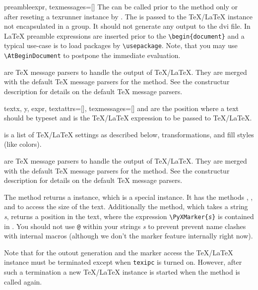 \begin{methoddesc}{preamble}{expr, texmessages=[]}
  The  can be called prior to the 
  method only or after reseting a texrunner instance by
  . The  is passed to the \TeX/\LaTeX{}
  instance not encapsulated in a group. It should not generate any
  output to the dvi file. In \LaTeX{} preamble expressions are
  inserted prior to the \texttt{\textbackslash{}begin\{document\}} and
  a typical use-case is to load packages by
  \texttt{\textbackslash{}usepackage}. Note, that you may use
  \texttt{\textbackslash{}AtBeginDocument} to postpone the
  immediate evaluation.

   are \TeX{} message parsers to handle the output of
  \TeX/\LaTeX. They are merged with the default \TeX{} message
  parsers for the  method. See the constructur
  description for details on the default \TeX{} message parsers.
\end{methoddesc}

\begin{methoddesc}{text}{x, y, expr, textattrs=[], texmessages=[]}
   and  are the position where a text should be typeset
  and  is the \TeX/\LaTeX{} expression to be passed to
  \TeX/\LaTeX{}.

   is a list of \TeX/\LaTeX{} settings as described
  below, \PyX{} transformations, and \PyX{} fill styles (like colors).

   are \TeX{} message parsers to handle the output of
  \TeX/\LaTeX. They are merged with the default \TeX{} message
  parsers for the  method. See the constructur
  description for details on the default \TeX{} message parsers.

  The  method returns a  instance, which
  is a special  instance. It has the methods
  , , and  to access
  the size of the text. Additionally the  method,
  which takes a string \emph{s}, returns a position in the text, where
  the expression \texttt{\textbackslash{}PyXMarker\{\emph{s}\}} is
  contained in . You should not use \texttt{@} within your
  strings \emph{s} to prevent prevent name clashes with \PyX{}
  internal macros (although we don't the marker feature internally
  right now).
\end{methoddesc}

Note that for the outout generation and the marker access the
\TeX/\LaTeX{} instance must be terminated except when \texttt{texipc} is
turned on. However, after such a termination a new \TeX/\LaTeX{}
instance is started when the  method is called again.

